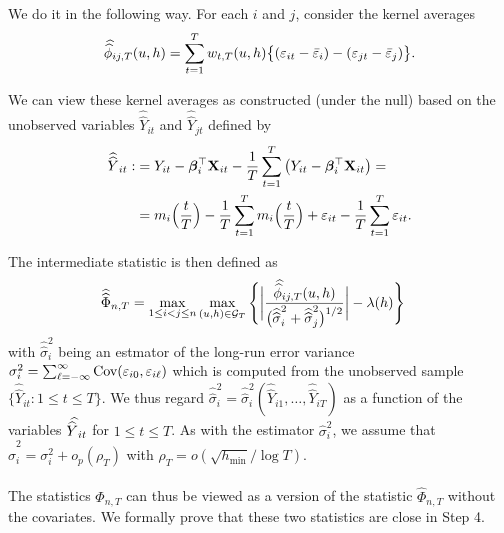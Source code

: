 \documentclass[a4paper,12pt]{article}
\newcommand{\doublehat}[1]{\skew{5.5}\widehat{\widehat{#1}}}
\newcommand{\doublehattwo}[1]{\widehat{\widehat{#1}}}
\begin{document}
We do it in the following way. For each $i$ and $j$, consider the kernel averages
\[\doublehat{\phi}_{ij,T}(u,h) = \sum_{t=1}^T w_{t,T}(u,h) \big\{ (\varepsilon_{it} - \bar{\varepsilon}_i) - (\varepsilon_{jt} - \bar{\varepsilon}_j)  \big\}. \]

We can view these kernel averages as constructed (under the null) based on the unobserved variables $\doublehattwo{Y}_{it}$ and  $\doublehattwo{Y}_{jt}$ defined by 
\begin{align*}
\doublehattwo{Y}_{it} :&= Y_{it} - \bfbeta_i^\top \mathbf{X}_{it} -  \frac{1}{T}\sum_{t=1}^T \big(Y_{it} - \bfbeta_i^\top \mathbf{X}_{it}\big) =\\
&=m_i \Big( \frac{t}{T} \Big)  - \frac{1}{T}\sum_{t=1}^T  m_i \Big( \frac{t}{T} \Big) + \varepsilon_{it} - \frac{1}{T}\sum_{t=1}^T \varepsilon_{it}.
\end{align*}

The intermediate statistic is then defined as 
\begin{align}\label{eqA:Phi_doublehat}
\doublehattwo{\Phi}_{n,T} &= \max_{1 \le i < j \le n}\max_{(u,h) \in \mathcal{G}_T} \Bigg\{\bigg|\frac{\doublehat{\phi}_{ij,T}(u,h)}{\big(\doublehattwo{\sigma}_i^2 + \doublehattwo{\sigma}_j^2\big)^{1/2}}\bigg| - \lambda(h)\Bigg\}
\end{align}
with $\doublehattwo{\sigma}_i^2$ being an estmator of the long-run error variance $\sigma_i^2 = \sum\nolimits_{\ell=-\infty}^{\infty} \textnormal{Cov}(\varepsilon_{i0}, \varepsilon_{i\ell})$ which is computed from the unobserved sample $\{ \doublehattwo{Y}_{it} : 1 \le t \le T \}$. We thus regard $\doublehattwo{\sigma}_i^2 = \doublehattwo{\sigma}_i^2(\doublehattwo{Y}_{i1},\ldots,\doublehattwo{Y}_{iT})$ as a function of the variables $\doublehat{Y}_{it}$ for $1 \le t \le T$. As with the estimator $\widehat{\sigma}_i^2$, we assume that $\doublehattwo{\sigma}_i^2 = \sigma_i^2 + o_p(\rho_T)$ with $\rho_T = o(\sqrt{h_{\min}}/\log T)$. 

The statistics $\doublehattwo{\Phi}_{n,T}$ can thus be viewed as a version of the statistic $\widehat{\Phi}_{n,T}$ without the covariates. We formally prove that these two statistics are close in Step 4.
\end{document}

